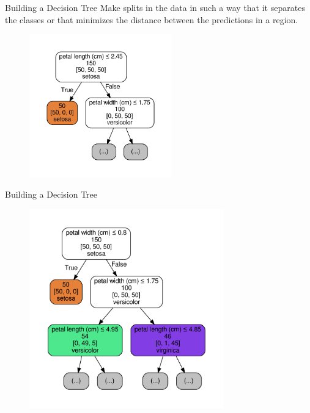 \documentclass[10pt]{beamer}
\begin{document}
\begin{frame}{Building a Decision Tree}
Make splits in the data in such a way that it separates the classes or that minimizes the distance between the predictions in a region.
		\begin{figure}	
			\includegraphics[width=0.55\textwidth, center, trim=0cm 0cm 0 0cm]{images/DT_2_simple.pdf}
	\end{figure}
\end{frame}

\begin{frame}{Building a Decision Tree}
		\begin{figure}	
			\includegraphics[width=0.75\textwidth, center, trim=0cm 0cm 0 0cm]{images/DT_3_simple.pdf}
	\end{figure}
\end{frame}
\end{document}
